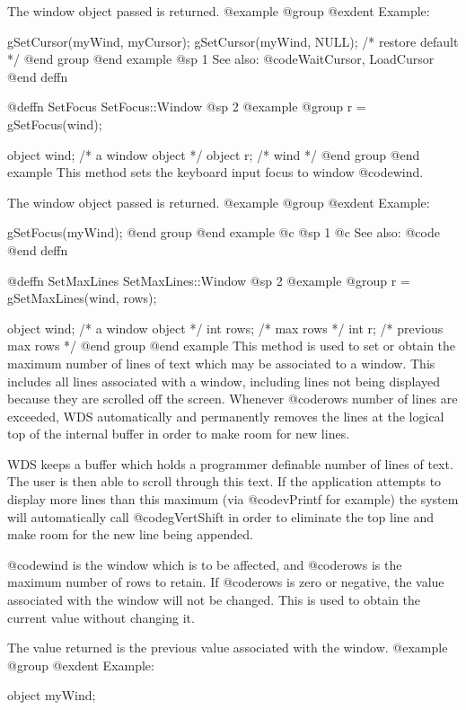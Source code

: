 The window object passed is returned.
@example
@group
@exdent Example:

gSetCursor(myWind, myCursor);
gSetCursor(myWind, NULL);  /* restore default */
@end group
@end example
@sp 1
See also:  @code{WaitCursor, LoadCursor}
@end deffn




@deffn {SetFocus} SetFocus::Window
@sp 2
@example
@group
r = gSetFocus(wind);

object  wind;   /*  a window object  */
object  r;      /*  wind             */
@end group
@end example
This method sets the keyboard input focus to window @code{wind}.

The window object passed is returned.
@example
@group
@exdent Example:

gSetFocus(myWind);
@end group
@end example
@c @sp 1
@c See also:  @code{}
@end deffn




@deffn {SetMaxLines} SetMaxLines::Window
@sp 2
@example
@group
r = gSetMaxLines(wind, rows);

object  wind;   /*  a window object     */
int     rows;   /*  max rows            */
int     r;      /*  previous max rows   */
@end group
@end example
This method is used to set or obtain the maximum number of lines of text
which may be associated to a window.  This includes all lines associated
with a window, including lines not being displayed because they are
scrolled off the screen.  Whenever @code{rows} number of lines are
exceeded, WDS automatically and permanently removes the lines at the
logical top of the internal buffer in order to make room for new
lines.

WDS keeps a buffer which holds a programmer definable number of lines of
text.  The user is then able to scroll through this text.  If the
application attempts to display more lines than this maximum (via
@code{vPrintf} for example) the system will automatically call
@code{gVertShift} in order to eliminate the top line and make room for
the new line being appended.

@code{wind} is the window which is to be affected, and @code{rows} is the
maximum number of rows to retain.  If @code{rows} is zero or negative,
the value associated with the window will not be changed.  This is used
to obtain the current value without changing it.

The value returned is the previous value associated with the window.
@example
@group
@exdent Example:

object  myWind;

